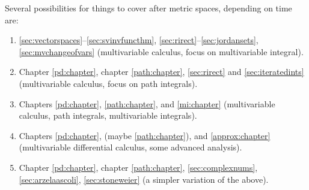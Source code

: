 Several possibilities for things to cover after metric spaces,
depending on time are:
\begin{enumerate}[1)]
\item
\ref{sec:vectorspaces}--\ref{sec:svinvfuncthm},
\ref{sec:rirect}--\ref{sec:jordansets}, \ref{sec:mvchangeofvars}
(multivariable calculus, focus on multivariable integral).
\item
Chapter \ref{pd:chapter}, chapter \ref{path:chapter},
\ref{sec:rirect} and \ref{sec:iteratedints}
(multivariable calculus, focus on path integrals).
\item Chapters \ref{pd:chapter}, \ref{path:chapter}, and
\ref{mi:chapter}
(multivariable calculus, path integrals, multivariable integrals).
\item
Chapters \ref{pd:chapter}, (maybe \ref{path:chapter}), and \ref{approx:chapter}
(multivariable differential calculus, some advanced analysis).
\item
Chapter \ref{pd:chapter}, chapter \ref{path:chapter}, 
\ref{sec:complexnums},
\ref{sec:arzelaascoli},
\ref{sec:stoneweier}
(a simpler variation of the above).
\end{enumerate}

